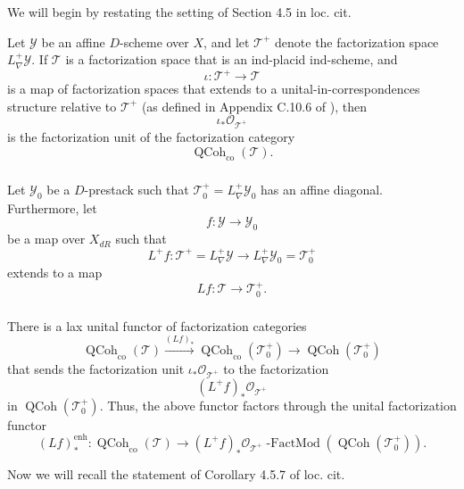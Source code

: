 \documentclass[10pt,a4paper]{amsart}
\newcommand{\on}[1]{\operatorname{#1}}
\newcommand{\QCoh}{\on{QCoh}}
\newcommand{\sssec}[1]{\subsubsection{}}
\begin{document}
\sssec{}
We will begin by restating the setting of Section 4.5 in loc. cit.

Let $\mathcal{Y}$ be an affine $D$-scheme over $X$, and let $\mathcal{T}^+$ denote the factorization space $L_{\nabla}^+\mathcal{Y}$. If $\mathcal{T}$ is a factorization space that is an ind-placid ind-scheme, and
$$
\iota : \mathcal{T}^+ \to \mathcal{T}
$$
is a map of factorization spaces that extends to a unital-in-correspondences structure relative to $\mathcal{T}^+$ (as defined in Appendix C.10.6 of \cite{GLC2}), then
$$
\iota_* \mathcal{O}_{\mathcal{T}^+}
$$
is the factorization unit of the factorization category
$$
\QCoh_{\on{co}}(\mathcal{T}).
$$

\sssec{}
Let $\mathcal{Y}_0$ be a $D$-prestack such that $\mathcal{T}_0^+ = L_{\nabla}^+ \mathcal{Y}_0$ has an affine diagonal. Furthermore, let 
$$
f : \mathcal{Y} \to \mathcal{Y}_0
$$
be a map over $X_{dR}$ such that
$$
L^+f : \mathcal{T}^+ = L_{\nabla}^+ \mathcal{Y} \to L_{\nabla}^+ \mathcal{Y}_0 = \mathcal{T}_0^+
$$
extends to a map
$$
Lf : \mathcal{T} \to \mathcal{T}_0^+.
$$

\sssec{}
There is a lax unital functor of factorization categories
$$
\QCoh_{\on{co}}(\mathcal{T}) \overset{(Lf)_*}{\to} \QCoh_{\on{co}}(\mathcal{T}_0^+) \to \QCoh(\mathcal{T}_0^+)
$$
that sends the factorization unit $\iota_* \mathcal{O}_{\mathcal{T}^+}$ to the factorization
$$
(L^+f)_*\mathcal{O}_{\mathcal{T}^+}
$$
in $\QCoh(\mathcal{T}_0^+)$. Thus, the above functor factors through the unital factorization functor
$$
(Lf)_*^{\on{enh}} : \QCoh_{\on{co}}(\mathcal{T}) \to (L^+f)_*\mathcal{O}_{\mathcal{T}^+}\on{-FactMod} (\QCoh(\mathcal{T}_0^+)).
$$

Now we will recall the statement of Corollary 4.5.7 of loc. cit.
\end{document}
